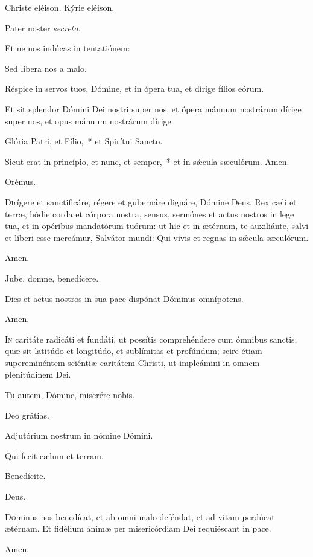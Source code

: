 \rr Christe eléison. Kýrie eléison.

\vv Pater noster \textit{secreto.}

\vv Et ne nos indúcas in tentatiónem:

\rr Sed líbera nos a malo.

\vv Réspice in servos tuos, Dómine, et in ópera tua, et dírige fílios eórum.

\rr Et sit splendor Dómini Dei nostri super nos, et ópera mánuum nostrárum
dírige super nos, et opus mánuum nostrárum dírige.

\vv Glória Patri, et Fílio,~* et Spirítui Sancto.

\rr Sicut erat in princípio, et nunc, et semper,~* et in sǽcula sæculórum. Amen.

Orémus.

\lettrine{D}{i}rígere et sanctificáre, régere et gubernáre dignáre, Dómine Deus, Rex
cæli et terræ, hódie corda et córpora nostra, sensus, sermónes et actus nostros in
lege tua, et in opéribus mandatórum tuórum: ut hic et in ætérnum, te auxiliánte,
salvi et líberi esse mereámur, Salvátor mundi: Qui vivis et regnas in sǽcula
sæculórum.

\rr Amen.

\vv Jube, domne, benedícere.


Dies et actus nostros in sua pace dispónat Dóminus omnípotens.

\rr Amen.

\lettrine{I}{n} caritáte radicáti et fundáti, ut possítis comprehéndere cum ómnibus sanctis, quæ sit latitúdo et longitúdo, et sublímitas et profúndum; scire étiam supereminéntem sciéntiæ caritátem Christi, ut impleámini in omnem plenitúdinem Dei.

\vv Tu autem, Dómine, miserére nobis.

\rr Deo grátias.

\vv Adjutórium nostrum in nómine Dómini.

\rr Qui fecit cælum et terram.

\vv Benedícite.

\rr Deus.

\lettrine{D}{o}minus nos benedícat, \cc{} et ab omni malo deféndat, et ad vitam perdúcat ætérnam. Et fidélium ánimæ per misericórdiam Dei requiéscant in pace.

\rr Amen.

\secreto
{}
 
{}


